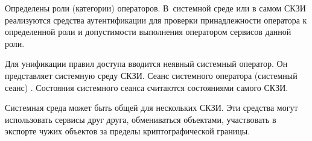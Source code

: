 
Определены роли (категории) операторов.
%
В~системной среде или в самом СКЗИ реализуются средства аутентификации для
проверки принадлежности оператора к определенной роли и допустимости выполнения
оператором сервисов данной роли.


Для унификации правил доступа вводится неявный системный оператор.
Он представляет системную среду СКЗИ. Сеанс системного оператора 
(системный сеанс) .
%
Состояния системного сеанса считаются состояниями самого СКЗИ.


Системная среда может быть общей для нескольких СКЗИ. Эти средства могут 
использовать сервисы друг друга, обмениваться объектами, участвовать в экспорте 
чужих объектов за пределы криптографической границы.

